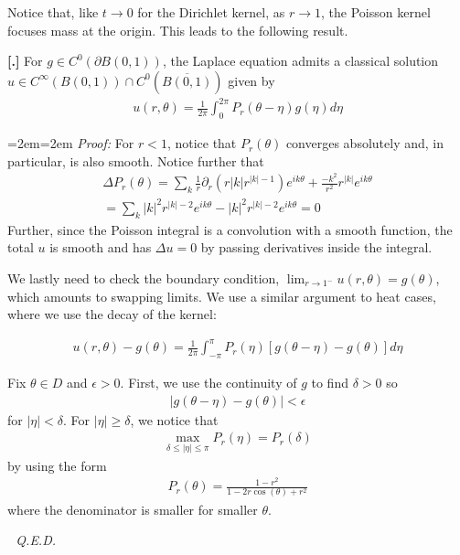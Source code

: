 \documentclass{article}
\newcommand{\cl}[1]{{\overline{#1}}}
\newcommand{\pd}{\partial}
\newcounter{result}[section]
\newenvironment{res}[1][]{\refstepcounter{result}\par\medskip
	\noindent \textbf{[\thesection.\theresult] #1} \rmfamily}{\medskip}
\newenvironment{pf}{%
	\par%
	\medskip
	\leftskip=2em\rightskip=2em%
	\noindent\ignorespaces \textit{Proof:} \newline}{%
	\,\, \newline \textit{Q.E.D.}\par\medskip}
\begin{document}
	Notice that, like $t \to 0$ for the Dirichlet kernel, as $r \to 1$, the Poisson kernel focuses mass at the origin. This leads to the following result.
	\begin{res}
		For $g \in C^{0}(\pd B(0,1))$, the Laplace equation admits a classical solution $u \in C^{\infty}(B(0,1)) \cap C^{0}(\cl{B(0,1)})$ given by 
		\begin{align*}
			u(r,\theta) = \frac{1}{2\pi} \int_{0}^{2\pi} P_{r}(\theta - \eta) g(\eta) d\eta
		\end{align*}
	\end{res}
	\begin{pf}
		For $r < 1$, notice that $P_{r}(\theta)$ converges absolutely and, in particular, is also smooth. Notice further that 
		\begin{align*}
			\Delta P_{r}(\theta) = \sum_{k} \frac{1}{r} \pd_{r} (r |k|r^{|k|-1} )e^{ik\theta} + \frac{-k^{2}}{r^{2}}r^{|k|}e^{ik\theta} \\
			= \sum_{k} |k|^{2}r^{|k|-2} e^{ik\theta} - |k|^{2}r^{|k|-2} e^{ik\theta}=0
		\end{align*}
		Further, since the Poisson integral is a convolution with a smooth function, the total $u$ is smooth and has $\Delta u =0$ by passing derivatives inside the integral. 
		
		We lastly need to check the boundary condition, $\lim_{r \to 1^-} u(r,\theta) = g(\theta)$, which amounts to swapping limits. We use a similar argument to heat cases, where we use the decay of the kernel:
		
		\begin{align*}
			u(r,\theta) -g(\theta) = \frac{1}{2\pi} \int_{-\pi}^{\pi} P_{r}(\eta) [g(\theta - \eta) - g(\theta) ] d\eta
		\end{align*}
		
		Fix $\theta \in D$ and $\epsilon > 0$. First, we use the continuity of $g$ to find $\delta > 0$ so 
		\begin{align*}
			|g(\theta - \eta) - g(\theta)| < \epsilon
		\end{align*}
		for $|\eta| < \delta$. For $|\eta| \geq \delta$, we notice that 
		\begin{align*}
			\max_{\delta \leq | \eta| \leq \pi} P_{r}(\eta) = P_{r}(\delta)
		\end{align*}
		by using the form 
		\begin{align*}
			P_{r}(\theta) = \frac{1-r^{2}}{1-2r\cos(\theta)+r^{2}}
		\end{align*}
		where the denominator is smaller for smaller $\theta$. 
		

\end{pf}
\end{document}
